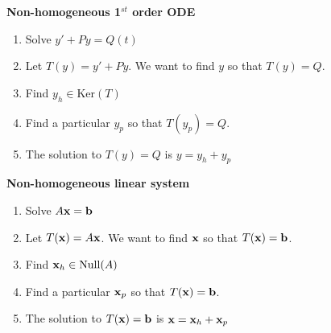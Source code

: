 \begin{minipage}{0.45\columnwidth}
    {\bf Non-homogeneous 1$^{st}$ order ODE}
    \begin{enumerate}
        \item Solve $y' + Py = Q(t)$
        \item Let $T(y) = y'+Py$.  We want to find $y$ so that $T(y) = Q$.
        \item Find $y_h \in \text{Ker}(T)$
        \item Find a particular $y_p$ so that $T(y_p) = Q$.
        \item The solution to $T(y) = Q$ is $y = y_h + y_p$
    \end{enumerate}
\end{minipage}
\begin{minipage}{0.45\columnwidth}
    {\bf Non-homogeneous linear system} 
    \begin{enumerate}
        \item Solve $A {\bf x} = {\bf b}$
        \item Let $T({\bf x}) = A{\bf x}$.  We want to find ${\bf x}$ so that $T({\bf x}) = {\bf b}$.
        \item Find ${\bf x}_h \in \text{Null}(A)$
        \item Find a particular ${\bf x}_p$ so that $T({\bf x}) = {\bf b}$.
        \item The solution to $T({\bf x})={\bf b}$ is ${\bf x} = {\bf x}_h+{\bf x}_p$
    \end{enumerate}
\end{minipage}

